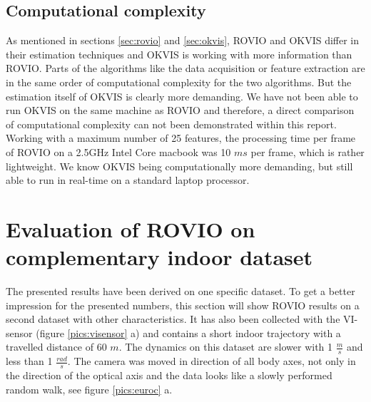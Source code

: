 \subsection{Computational complexity}
\label{sec:ijrr_complexity}

As mentioned in sections \ref{sec:rovio} and \ref{sec:okvis}, ROVIO and OKVIS differ in their estimation techniques and OKVIS is working with more information than ROVIO. Parts of the algorithms like the data acquisition or feature extraction are in the same order of computational complexity for the two algorithms. But the estimation itself of OKVIS is clearly more demanding. We have not been able to run OKVIS on the same machine as ROVIO and therefore, a direct comparison of computational complexity can not been demonstrated within this report. Working with a maximum number of 25 features, the processing time per frame of ROVIO on a 2.5GHz Intel Core macbook was 10 $ms$ per frame, which is rather lightweight. We know OKVIS being computationally more demanding, but still able to run in real-time on a standard laptop processor.


\section{Evaluation of ROVIO on complementary indoor dataset}
\label{sec:euroc}

The presented results have been derived on one specific dataset. To get a better impression for the presented numbers, this section will show ROVIO results on a second dataset with other characteristics. It has also been collected with the VI-sensor (figure \ref{pics:visensor} a) and contains a short indoor trajectory with a travelled distance of 60 $m$. The dynamics on this dataset are slower with 1 $\frac{m}{s}$ and less than 1 $\frac{rad}{s}$. The camera was moved in direction of all body axes, not only in the direction of the optical axis and the data looks like a slowly performed random walk, see figure \ref{pics:euroc} a. \\

